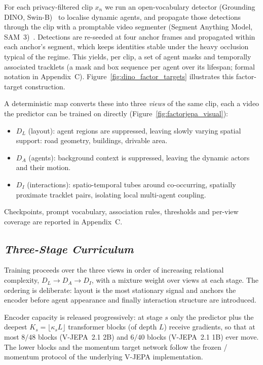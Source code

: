 For each privacy-filtered clip $x_n$ we run an open-vocabulary detector
(Grounding DINO, Swin-B)~\cite{liu2024groundingdino} to localise dynamic agents, and propagate
those detections through the clip with a promptable video segmenter
(Segment Anything Model, SAM~3)~\cite{carion2025sam3}. Detections are re-seeded at four anchor frames and propagated
within each anchor's segment, which keeps identities stable under the heavy occlusion typical
of the regime. This yields, per clip, a set of agent masks and temporally associated tracklets
(a mask and box sequence per agent over its lifespan; formal notation in Appendix~C).
Figure~\ref{fig:dino_factor_targets} illustrates this factor-target construction.

A deterministic map converts these into three \emph{views} of the same clip, each a video the
predictor can be trained on directly (Figure~\ref{fig:factorjepa_visual}):

\begin{itemize}[leftmargin=1.2em,itemsep=2pt,topsep=2pt]
\item $D_L$ (layout): agent regions are suppressed, leaving slowly varying spatial
      support: road geometry, buildings, drivable area.
\item $D_A$ (agents): background context is suppressed, leaving the dynamic actors and
      their motion.
\item $D_I$ (interactions): spatio-temporal tubes around co-occurring, spatially
      proximate tracklet pairs, isolating local multi-agent coupling.
\end{itemize}

Checkpoints, prompt vocabulary, association rules, thresholds and per-view
coverage are reported in Appendix~C.

\subsection{\textbf{\emph{Three-Stage Curriculum}}}

Training proceeds over the three views in order of increasing relational complexity,
$D_L\rightarrow D_A\rightarrow D_I$, with a mixture weight over views at each stage. The
ordering is deliberate: layout is the most stationary signal and anchors the encoder before
agent appearance and finally interaction structure are introduced.

Encoder capacity is released progressively: at stage $s$ only the predictor plus the
deepest $K_s=\lfloor \kappa_s L\rfloor$ transformer blocks (of depth $L$) receive
gradients, so that at most $8/48$ blocks (V-JEPA~2.1 2B) and $6/40$ blocks (V-JEPA~2.1 1B) ever move. The lower blocks and the momentum target network follow the frozen / momentum
protocol of the underlying V-JEPA implementation.

